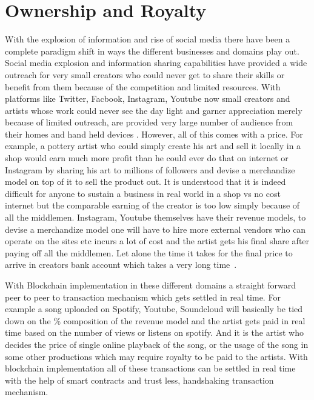 \section{Ownership and Royalty}

With the explosion of information and rise of social media there have
been a complete paradigm shift in ways the different businesses and
domains play out. Social media explosion and information sharing
capabilities have provided a wide outreach for very small creators who
could never get to share their skills or benefit from them because of
the competition and limited resources. With platforms like
Twitter, Facbook, Instagram, Youtube now small creators
and artists whose work could never see the day light and garner
appreciation merely because of limited outreach, are provided very
large number of audience from their homes and hand held devices
\cite{saleem24}. However, all of this comes with a price. For example,
a pottery artist who could simply create his art and sell it locally
in a shop would earn much more profit than he could ever do that on
internet or Instagram by sharing his art to millions of followers and
devise a merchandize model on top of it to sell the product out. It is
understood that it is indeed difficult for anyone to sustain a business
in real world in a shop vs no cost internet but the comparable earning
of the creator is too low simply because of all the middlemen.
Instagram, Youtube themselves have their revenue models, to devise a
merchandize model one will have to hire more external vendors who can
operate on the sites etc incurs a lot of cost and the artist gets his
final share after paying off all the middlemen. Let alone the time it
takes for the final price to arrive in creators bank account which
takes a very long time~\cite{margaret25}.

With Blockchain implementation in these different domains a straight
forward peer to peer to transaction mechanism which gets settled in
real time. For example a song uploaded on Spotify, Youtube,
Soundcloud will basically be tied down on the \% composition of the
revenue model and the artist gets paid in real time based on the
number of views or listens on spotify. And it is the artist who decides
the price of single online playback of the song, or the usage of the
song in some other productions which may require royalty to be paid to
the artists. With blockchain implementation all of these transactions
can be settled in real time with the help of smart contracts and trust
less, handshaking transaction mechanism.


